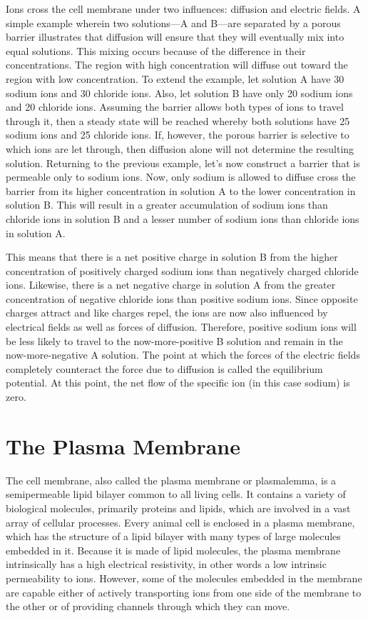 \documentclass[]{book}
\begin{document}
Ions cross the cell membrane under two influences: diffusion and electric fields. A simple example wherein two solutions---A and B---are separated by a porous barrier illustrates that diffusion will ensure that they will eventually mix into equal solutions. This mixing occurs because of the difference in their concentrations. The region with high concentration will diffuse out toward the region with low concentration. To extend the example, let solution A have 30 sodium ions and 30 chloride ions. Also, let solution B have only 20 sodium ions and 20 chloride ions. Assuming the barrier allows both types of ions to travel through it, then a steady state will be reached whereby both solutions have 25 sodium ions and 25 chloride ions. If, however, the porous barrier is selective to which ions are let through, then diffusion alone will not determine the resulting solution. Returning to the previous example, let's now construct a barrier that is permeable only to sodium ions. Now, only sodium is allowed to diffuse cross the barrier from its higher concentration in solution A to the lower concentration in solution B. This will result in a greater accumulation of sodium ions than chloride ions in solution B and a lesser number of sodium ions than chloride ions in solution A.

This means that there is a net positive charge in solution B from the higher concentration of positively charged sodium ions than negatively charged chloride ions. Likewise, there is a net negative charge in solution A from the greater concentration of negative chloride ions than positive sodium ions. Since opposite charges attract and like charges repel, the ions are now also influenced by electrical fields as well as forces of diffusion. Therefore, positive sodium ions will be less likely to travel to the now-more-positive B solution and remain in the now-more-negative A solution. The point at which the forces of the electric fields completely counteract the force due to diffusion is called the equilibrium potential. At this point, the net flow of the specific ion (in this case sodium) is zero.

\hypertarget{the-plasma-membrane}{%
\section{The Plasma Membrane}\label{the-plasma-membrane}}

The cell membrane, also called the plasma membrane or plasmalemma, is a semipermeable lipid bilayer common to all living cells. It contains a variety of biological molecules, primarily proteins and lipids, which are involved in a vast array of cellular processes.
Every animal cell is enclosed in a plasma membrane, which has the structure of a lipid bilayer with many types of large molecules embedded in it. Because it is made of lipid molecules, the plasma membrane intrinsically has a high electrical resistivity, in other words a low intrinsic permeability to ions. However, some of the molecules embedded in the membrane are capable either of actively transporting ions from one side of the membrane to the other or of providing channels through which they can move.
\end{document}
